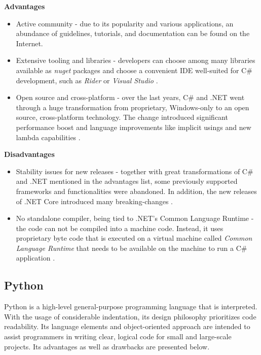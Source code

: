 \textbf{Advantages}
\begin{itemize}
    \item Active community - due to its popularity and various applications, an abundance of guidelines, tutorials, and documentation can be found on the Internet.
    \item Extensive tooling and libraries - developers can choose among many libraries available as \textit{nuget} packages and choose a convenient IDE well-suited for C\# development, such as \textit{Rider} or \textit{Visual Studio}  \cite{net-tools} \cite{nuget}.
    \item Open source and cross-platform - over the last years, C\# and .NET went through a huge transformation from proprietary, Windows-only to an open source, cross-platform technology. The change introduced significant performance boost and language improvements like implicit usings and new lambda capabilities \cite{net6}. 
\end{itemize}

\textbf{Disadvantages}
\begin{itemize}
    \item Stability issues for new releases - together with great transformations of C\# and .NET mentioned in the advantages list, some previously supported frameworks and functionalities were abandoned. In addition, the new releases of .NET Core introduced many breaking-changes \cite{net-breaking-changes}. 
    \item No standalone compiler, being tied to .NET's Common Language Runtime - the code can not be compiled into a machine code. Instead, it uses proprietary byte code that is executed on a virtual machine called \textit{Common Language Runtime} that needs to be available on the machine to run a C\# application \cite{c-sharp-tour}.
\end{itemize}

\subsection{Python}

Python is a high-level general-purpose programming language that is interpreted. With the usage of considerable indentation, its design philosophy prioritizes code readability. Its language elements and object-oriented approach are intended to assist programmers in writing clear, logical code for small and large-scale projects. Its advantages as well as drawbacks are presented below.

